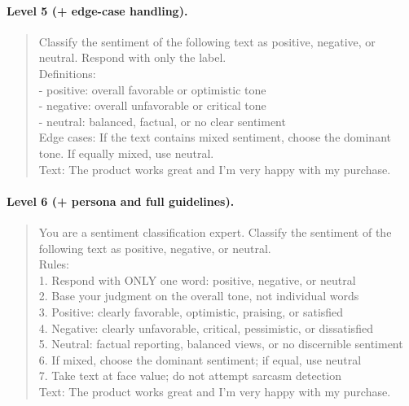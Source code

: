 \paragraph{Level 5 (+ edge-case handling).}
\begin{quote}\small\ttfamily
Classify the sentiment of the following text as positive, negative, or neutral.
Respond with only the label.\\[4pt]
Definitions:\\
- positive: overall favorable or optimistic tone\\
- negative: overall unfavorable or critical tone\\
- neutral: balanced, factual, or no clear sentiment\\[4pt]
Edge cases: If the text contains mixed sentiment, choose the dominant tone. If
equally mixed, use neutral.\\[4pt]
Text: The product works great and I'm very happy with my purchase.
\end{quote}

\paragraph{Level 6 (+ persona and full guidelines).}
\begin{quote}\small\ttfamily
You are a sentiment classification expert. Classify the sentiment of the
following text as positive, negative, or neutral.\\[4pt]
Rules:\\
1. Respond with ONLY one word: positive, negative, or neutral\\
2. Base your judgment on the overall tone, not individual words\\
3. Positive: clearly favorable, optimistic, praising, or satisfied\\
4. Negative: clearly unfavorable, critical, pessimistic, or dissatisfied\\
5. Neutral: factual reporting, balanced views, or no discernible sentiment\\
6. If mixed, choose the dominant sentiment; if equal, use neutral\\
7. Take text at face value; do not attempt sarcasm detection\\[4pt]
Text: The product works great and I'm very happy with my purchase.
\end{quote}

